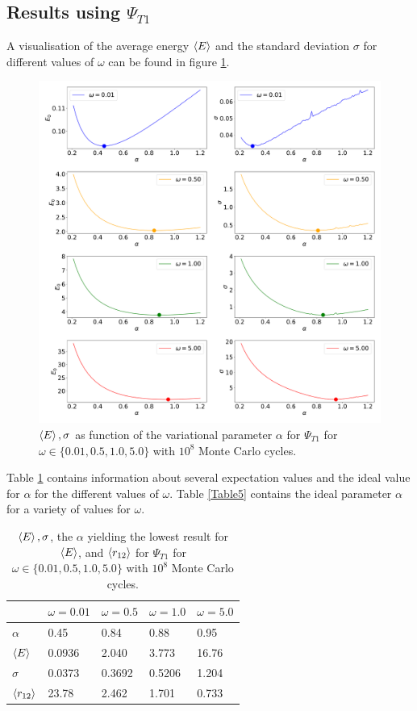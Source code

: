 \documentclass[10pt,a4paper]{article}
\begin{document}
\subsection{Results using $\Psi_{T1}$}
A visualisation of the average energy $\braket{E}$ and the standard deviation $\sigma$ for different values of $\omega$ can be found in figure \ref{function1_plot}. 
\begin{figure}[H]
\centering
\includegraphics[width=\textwidth]{function1_plot.pdf}
\caption[$\braket{E},\sigma$ as function of $\alpha$]{$\braket{E},\sigma$ as function of the variational parameter $\alpha$ for $\Psi_{T1}$ for $\omega\in\{0.01,0.5,1.0,5.0\}$ with $10^8$ Monte Carlo cycles.}\label{function1_plot}
\end{figure}
Table \ref{table1} contains information about several expectation values and the ideal value for $\alpha$ for the different values of $\omega$. Table \ref{Table5} contains the ideal parameter $\alpha$ for a variety of values for $\omega$.
\begin{table}[H]
\centering
\caption[$\braket{E},\sigma$, $\alpha$ and $\braket{r_{12}}$]{$\braket{E},\sigma$, the $\alpha$ yielding the lowest result for  $\braket{E}$, and $\braket{r_{12}}$ for $\Psi_{T1}$ for $\omega\in\{0.01,0.5,1.0,5.0\}$ with $10^8$ Monte Carlo cycles.}
\begin{tabular}{|l|l|l|l|l|}
\hline
                  & $\omega=0.01$ & $\omega=0.5$ & $\omega=1.0$ & $\omega=5.0$ \\ \hline
$\alpha$          & 0.45          & 0.84         & 0.88         & 0.95         \\ \hline
$\braket{E}$      & 0.0936        & 2.040        & 3.773        & 16.76        \\ \hline
$\sigma$          & 0.0373        & 0.3692       & 0.5206       & 1.204        \\ \hline
$\braket{r_{12}}$ & 23.78         & 2.462        & 1.701        & 0.733        \\ \hline
\end{tabular}\label{table1}
\end{table}
\end{document}
